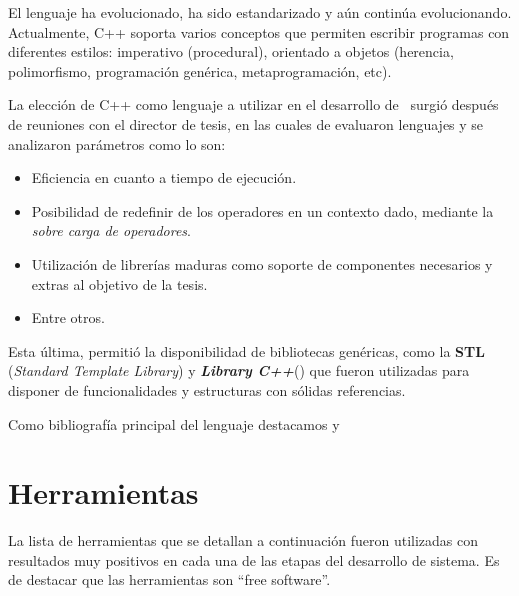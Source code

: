 El lenguaje ha evolucionado, ha sido estandarizado y aún continúa evolucionando. Actualmente, C++ soporta varios conceptos que permiten escribir programas con diferentes estilos: imperativo (procedural), orientado a objetos (herencia, polimorfismo, programación genérica, metaprogramación, etc).

La elección de C++ como lenguaje a utilizar en el desarrollo de \maggen\ surgió después de reuniones con el director de tesis, en las cuales de evaluaron lenguajes y se analizaron parámetros como lo son:

\begin{itemize}
\item Eficiencia en cuanto a tiempo de ejecución.

\item Posibilidad de redefinir de los operadores en un contexto dado, mediante la \textit{sobre carga de operadores}.

\item Utilización de librerías maduras como soporte de componentes necesarios y extras al objetivo de la tesis.

\item Entre otros.
\end{itemize}

Esta última, permitió la disponibilidad de bibliotecas genéricas, como la \textbf{STL} (\textit{Standard Template Library}) y \boost \textbf{\textit{Library C++}}(\cite{boost}) que fueron utilizadas para disponer de funcionalidades y estructuras con sólidas referencias.

Como bibliografía principal del lenguaje destacamos \cite{c++1} y \cite{c++2}

\section{Herramientas}
\label{sec:metoherram}
La lista de herramientas que se detallan a continuación fueron utilizadas con resultados muy positivos en cada una de las etapas del desarrollo de sistema. Es de destacar que las herramientas son ``free software''.

